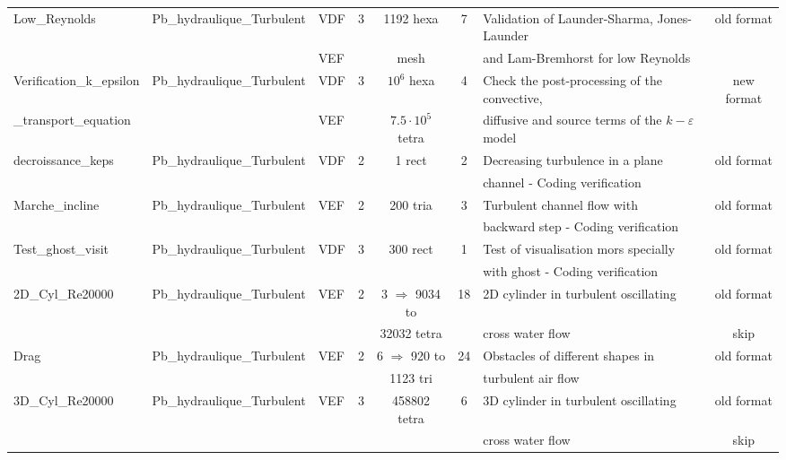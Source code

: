 \begin{table}[H]
\begin{centering}
\begin{tabular}{lclccclc}
\rowcolor{SkyBlue!10}Low\_Reynolds & Pb\_hydraulique\_Turbulent & VDF & 3 & 1192 hexa & 7 & Validation of Launder-Sharma, Jones-Launder & old format \\ 
\rowcolor{SkyBlue!10} & & VEF & & mesh & & and Lam-Bremhorst for low Reynolds & \\ \hline
\rowcolor{SkyBlue!10}Verification\_k\_epsilon & Pb\_hydraulique\_Turbulent & VDF & 3 & $10^6$ hexa & 4 & Check the post-processing of the convective, & new format \\ 
\rowcolor{SkyBlue!10}\_transport\_equation & & VEF & & $7.5 \cdot 10^5$ tetra & & diffusive and source terms of the $k-\varepsilon$ model &  \\ \hline
\rowcolor{SkyBlue!10}decroissance\_keps & Pb\_hydraulique\_Turbulent & VDF & 2 & 1 rect & 2 & Decreasing turbulence in a plane  & old format \\ 
\rowcolor{SkyBlue!10} & & & & & & channel - Coding verification& \\ \hline
\rowcolor{SkyBlue!10}Marche\_incline & Pb\_hydraulique\_Turbulent & VEF & 2 & 200 tria & 3 & Turbulent channel flow with  & old format \\ 
\rowcolor{SkyBlue!10} & & & & & & backward step - Coding verification & \\ \hline
\rowcolor{SkyBlue!10}Test\_ghost\_visit & Pb\_hydraulique\_Turbulent & VDF & 3 & 300 rect & 1 & Test of visualisation mors specially   & old format \\ 
\rowcolor{SkyBlue!10} & & & & & & with ghost - Coding verification & \\ \hline
\rowcolor{SkyBlue!10}2D\_Cyl\_Re20000 & Pb\_hydraulique\_Turbulent & VEF & 2 & 3 $\Rightarrow$ 9034 to & 18 & 2D cylinder in turbulent oscillating  & old format \\ 
\rowcolor{SkyBlue!10} & & & & 32032 tetra & & cross water flow & skip \\ \hline
\rowcolor{SkyBlue!10}Drag & Pb\_hydraulique\_Turbulent & VEF & 2 & 6 $\Rightarrow$ 920 to & 24 & Obstacles of different shapes in & old format \\ 
\rowcolor{SkyBlue!10} & & & & 1123 tri & & turbulent air flow & \\\hline \rowcolor{SkyBlue!10}3D\_Cyl\_Re20000 & Pb\_hydraulique\_Turbulent & VEF & 3 & 458802 tetra & 6 & 3D cylinder in turbulent oscillating & old format \\ 
\rowcolor{SkyBlue!10} & & & & & & cross water flow & skip \\ \hline

	\end{tabular}
\end{centering}
\end{table}

